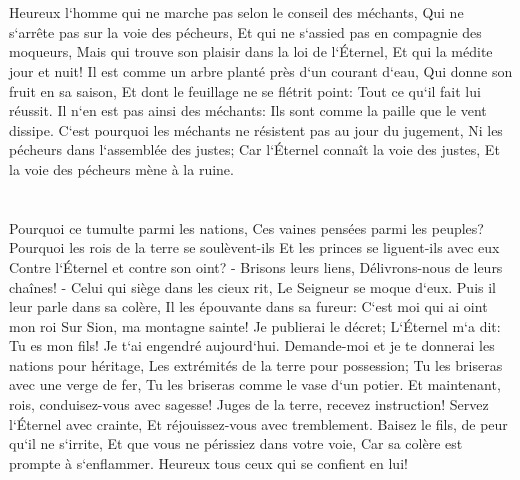 

\chapter{}

\verse Heureux l`homme qui ne marche pas selon le conseil des méchants, Qui ne s`arrête pas sur la voie des pécheurs, Et qui ne s`assied pas en compagnie des moqueurs, 
\verse Mais qui trouve son plaisir dans la loi de l`Éternel, Et qui la médite jour et nuit! 
\verse Il est comme un arbre planté près d`un courant d`eau, Qui donne son fruit en sa saison, Et dont le feuillage ne se flétrit point: Tout ce qu`il fait lui réussit. 
\verse Il n`en est pas ainsi des méchants: Ils sont comme la paille que le vent dissipe. 
\verse C`est pourquoi les méchants ne résistent pas au jour du jugement, Ni les pécheurs dans l`assemblée des justes; 
\verse Car l`Éternel connaît la voie des justes, Et la voie des pécheurs mène à la ruine. 

\chapter{}

\verse Pourquoi ce tumulte parmi les nations, Ces vaines pensées parmi les peuples? 
\verse Pourquoi les rois de la terre se soulèvent-ils Et les princes se liguent-ils avec eux Contre l`Éternel et contre son oint? - 
\verse Brisons leurs liens, Délivrons-nous de leurs chaînes! - 
\verse Celui qui siège dans les cieux rit, Le Seigneur se moque d`eux. 
\verse Puis il leur parle dans sa colère, Il les épouvante dans sa fureur: 
\verse C`est moi qui ai oint mon roi Sur Sion, ma montagne sainte! 
\verse Je publierai le décret; L`Éternel m`a dit: Tu es mon fils! Je t`ai engendré aujourd`hui. 
\verse Demande-moi et je te donnerai les nations pour héritage, Les extrémités de la terre pour possession; 
\verse Tu les briseras avec une verge de fer, Tu les briseras comme le vase d`un potier. 
\verse Et maintenant, rois, conduisez-vous avec sagesse! Juges de la terre, recevez instruction! 
\verse Servez l`Éternel avec crainte, Et réjouissez-vous avec tremblement. 
\verse Baisez le fils, de peur qu`il ne s`irrite, Et que vous ne périssiez dans votre voie, Car sa colère est prompte à s`enflammer. Heureux tous ceux qui se confient en lui! 

\chapter{}


